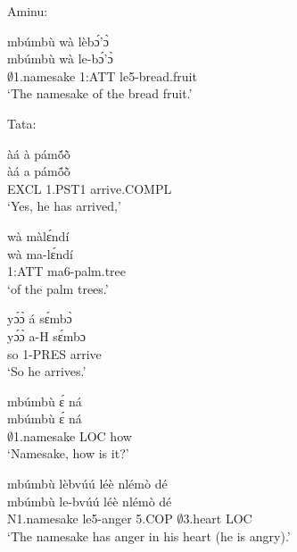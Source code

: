 \noindent Aminu:

\begin{exe} 
\exN\label{209}
  \glll mbúmbù wà lèbɔ́'ɔ̀ \\
         mbúmbù wà le-bɔ́'ɔ̀ \\
        $\emptyset$1.namesake 1:ATT le5-bread.fruit \\
    \trans `The namesake of the bread fruit.'
\end{exe}

\noindent Tata:

\begin{exe} 
\exN\label{210}
  \glll àá à pámṍõ̀ \\
       àá a pámṍõ̀ \\
       EXCL 1.PST1 arrive.COMPL  \\
    \trans `Yes, he has arrived,'
\end{exe}

\begin{exe} 
\exN\label{211}
  \glll wà màlɛ́ndí\\
       wà ma-lɛ́ndí \\
         1:ATT ma6-palm.tree \\
    \trans `of the palm trees.'
\end{exe}

\begin{exe} 
\exN\label{212}
  \glll yɔ́ɔ̀ á sɛ́mbɔ̀ \\
          yɔ́ɔ̀ a-H sɛ́mbɔ \\
         so 1-PRES arrive \\
    \trans `So he arrives.'
\end{exe}

\begin{exe} 
\exN\label{213}
  \glll mbúmbù ɛ́ ná \\
        mbúmbù ɛ́ ná \\
        $\emptyset$1.namesake LOC how  \\
    \trans `Namesake, how is it?'
\end{exe}

\begin{exe} 
\exN\label{214} 
  \glll mbúmbù lèbvúú léè nlémò dé \\
         mbúmbù le-bvúú léè nlémò dé \\
        N1.namesake le5-anger 5.COP $\emptyset$3.heart LOC  \\
    \trans `The namesake has anger in his heart (he is angry).'
\end{exe}

